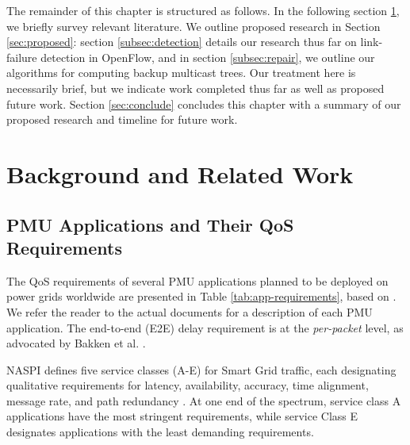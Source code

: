 The remainder of this chapter is structured as follows.  In the following section \ref{sec:related-work}, we briefly survey relevant literature.  
We outline proposed research in Section \ref{sec:proposed}:
section \ref{subsec:detection} details our research thus far on link-failure detection in OpenFlow, and in section \ref{subsec:repair}, we outline our algorithms for computing backup multicast trees.
Our treatment here is necessarily brief, but we indicate work completed thus far as well as proposed future work.  Section \ref{sec:conclude} concludes this chapter with a summary of our proposed research and 
timeline for future work.
















\section{Background and Related Work}
\label{sec:related-work}

\subsection{PMU Applications and Their QoS Requirements} 
\label{subsec:pmu-requirements}

The QoS requirements of several PMU applications planned to be deployed on power grids worldwide are presented in Table \ref{tab:app-requirements}, based on \cite{Bakken11,Kth09}.
We refer the reader to the actual documents for a description of each PMU application.  The end-to-end (E2E) delay requirement is at the \emph{per-packet} level, as advocated by
Bakken et al. \cite{Bakken11}.

NASPI defines five service classes (A-E) for Smart Grid traffic, each designating qualitative requirements for latency, availability, accuracy, time alignment, message rate, 
and path redundancy \cite{Bakken11}. At one end of the spectrum, service class A applications have the most stringent requirements, while service Class E designates applications
with the least demanding requirements.

